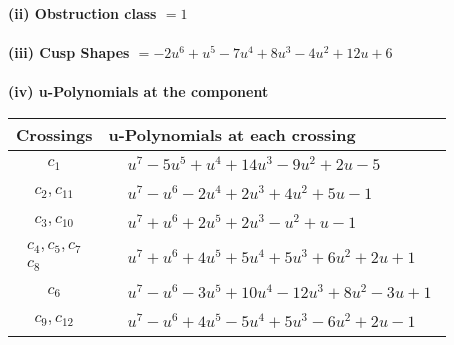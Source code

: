 \documentclass[1p]{elsarticle_modified}
\theoremstyle{definition}
\begin{document}
\flushleft \textbf{(ii) Obstruction class $= 1$}\\~\\
\flushleft \textbf{(iii) Cusp Shapes $= -2 u^6+u^5-7 u^4+8 u^3-4 u^2+12 u+6$}\\~\\
\newpage\renewcommand{\arraystretch}{1}
\flushleft \textbf{(iv) u-Polynomials at the component}\newline \\
\begin{tabular}{m{50pt}|m{274pt}}
Crossings & \hspace{64pt}u-Polynomials at each crossing \\
\hline $$\begin{aligned}c_{1}\end{aligned}$$&$\begin{aligned}
&u^7-5 u^5+u^4+14 u^3-9 u^2+2 u-5
\end{aligned}$\\
\hline $$\begin{aligned}c_{2},c_{11}\end{aligned}$$&$\begin{aligned}
&u^7- u^6-2 u^4+2 u^3+4 u^2+5 u-1
\end{aligned}$\\
\hline $$\begin{aligned}c_{3},c_{10}\end{aligned}$$&$\begin{aligned}
&u^7+u^6+2 u^5+2 u^3- u^2+u-1
\end{aligned}$\\
\hline $$\begin{aligned}c_{4},c_{5},c_{7}\\c_{8}\end{aligned}$$&$\begin{aligned}
&u^7+u^6+4 u^5+5 u^4+5 u^3+6 u^2+2 u+1
\end{aligned}$\\
\hline $$\begin{aligned}c_{6}\end{aligned}$$&$\begin{aligned}
&u^7- u^6-3 u^5+10 u^4-12 u^3+8 u^2-3 u+1
\end{aligned}$\\
\hline $$\begin{aligned}c_{9},c_{12}\end{aligned}$$&$\begin{aligned}
&u^7- u^6+4 u^5-5 u^4+5 u^3-6 u^2+2 u-1
\end{aligned}$\\
\hline
\end{tabular}\\~\\
\end{document}
